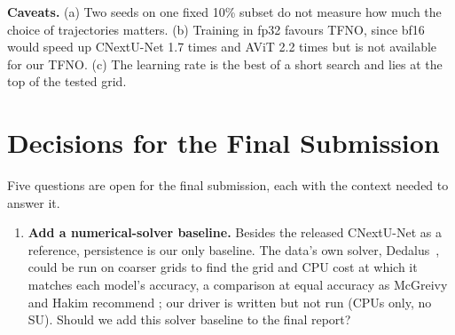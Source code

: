\documentclass[11pt]{article}
\begin{document}
\textbf{Caveats.} (a) Two seeds on one fixed
10\% subset do not measure how much the choice of trajectories matters. (b) Training in fp32 favours TFNO, since bf16
would speed up CNextU-Net 1.7 times and AViT 2.2 times but is not available for our TFNO. (c) The learning rate is the
best of a short search and lies at the top of the tested grid.

\newpage
\section{Decisions for the Final Submission}
\label{sec:decisions}

Five questions are open for the final submission, each with the context needed to answer it.

\begin{enumerate}    
    \item \label{q:baselines}\textbf{Add a numerical-solver baseline.}
    Besides the released CNextU-Net as a reference, persistence is our only baseline. The data's own solver,
    Dedalus~\cite{burns2020dedalus}, could be run on coarser grids to find the grid and CPU cost at which it
    matches each model's accuracy, a comparison at equal accuracy as McGreivy and Hakim recommend
    \cite{mcgreivy2024weak}; our driver is written but not run (CPUs only, no SU). Should we add this solver
    baseline to the final report?



\end{enumerate}
\end{document}
